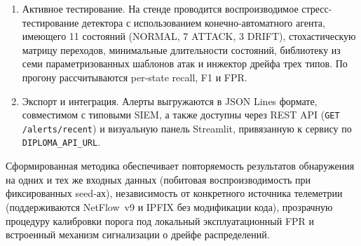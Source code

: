 \begin{enumerate}
    подсистема \texttt{drift\_report} вычисляет индексы PSI, KL и
    MMD$^2$ между текущим окном и эталонной обучающей выборкой;
    при превышении порога $\operatorname{PSI} > 0{,}25$
    устанавливается индикатор \texttt{drift\_alarm}, направляемый
    в SOC как событие дрейфа.
    \item Активное тестирование. На стенде проводится
    воспроизводимое стресс-тестирование детектора с использованием
    конечно-автоматного агента, имеющего 11 состояний (NORMAL,
    7 ATTACK, 3 DRIFT), стохастическую матрицу переходов,
    минимальные длительности состояний, библиотеку из семи
    параметризованных шаблонов атак и инжектор дрейфа трех типов.
    По прогону рассчитываются per-state recall, F1 и FPR.
    \item Экспорт и интеграция. Алерты выгружаются в JSON Lines
    формате, совместимом с типовыми SIEM, а также доступны через
    REST API (\texttt{GET /alerts/recent}) и визуальную панель
    Streamlit, привязанную к сервису по \texttt{DIPLOMA\_API\_URL}.
\end{enumerate}

Сформированная методика обеспечивает повторяемость результатов
обнаружения на одних и тех же входных данных (побитовая
воспроизводимость при фиксированных seed-ах), независимость от
конкретного источника телеметрии (поддерживаются NetFlow~v9 и
IPFIX без модификации кода), прозрачную процедуру калибровки порога
под локальный эксплуатационный FPR и встроенный механизм
сигнализации о дрейфе распределений.
